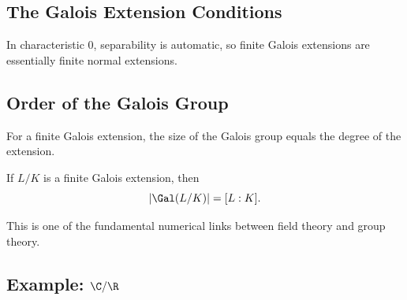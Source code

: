 \subsection{The Galois Extension Conditions}
\label{subsec:galois-extension-visual}

\begin{center}
\end{center}

In characteristic \(0\), separability is automatic, so finite Galois
extensions are essentially finite normal extensions.

\subsection{Order of the Galois Group}
\label{subsec:order-galois-group}

For a finite Galois extension, the size of the Galois group equals the degree
of the extension.

\begin{theorem}
If \(L/K\) is a finite Galois extension, then
\[ |\Gal(L/K)|=[L:K]. \]
\end{theorem}

This is one of the fundamental numerical links between field theory and group
theory.

\subsection{Example: \(\C/\R\)}
\label{subsec:galois-complex-real}

